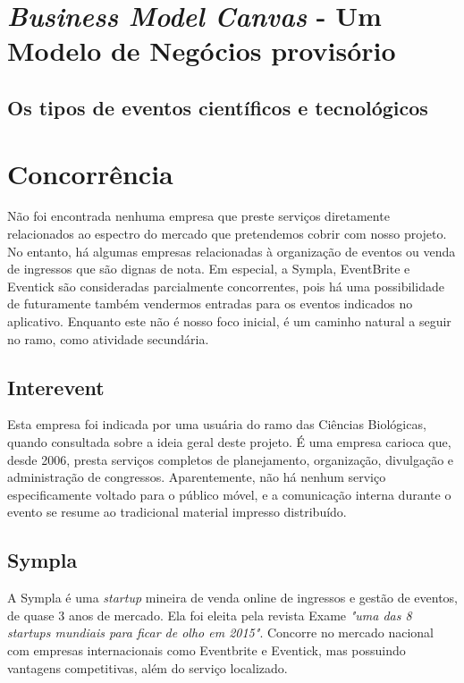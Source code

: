 \documentclass[a4paper]{abntex2}
\begin{document}
\section{\emph{Business Model Canvas} - Um Modelo de Negócios provisório}



\subsection{Os tipos de eventos científicos e tecnológicos} \label{sec:eventos} %

\section{Concorrência}
Não foi encontrada nenhuma empresa que preste serviços diretamente relacionados ao espectro do mercado que pretendemos cobrir com nosso projeto. No entanto, há algumas empresas relacionadas à organização de eventos ou venda de ingressos que são dignas de nota. Em especial, a Sympla, EventBrite e Eventick são consideradas parcialmente concorrentes, pois há uma possibilidade de futuramente também vendermos entradas para os eventos indicados no aplicativo. Enquanto este não é nosso foco inicial, é um caminho natural a seguir no ramo, como atividade secundária.


\subsection*{Interevent}
Esta empresa foi indicada por uma usuária do ramo das Ciências Biológicas, quando consultada sobre a ideia geral deste projeto. É uma empresa carioca que, desde 2006, presta serviços completos de planejamento, organização, divulgação e administração de congressos. Aparentemente, não há nenhum serviço especificamente voltado para o público móvel, e a comunicação interna durante o evento se resume ao tradicional material impresso distribuído.

\subsection*{Sympla}
A Sympla é uma \emph{startup} mineira de venda online de ingressos e gestão de eventos, de quase 3 anos de mercado. Ela foi eleita pela revista Exame \emph{"uma das 8 startups mundiais para ficar de olho em 2015"}\cite{exame-8-startups}. Concorre no mercado nacional com empresas internacionais como Eventbrite e Eventick, mas possuindo vantagens competitivas, além do serviço localizado.
\end{document}
